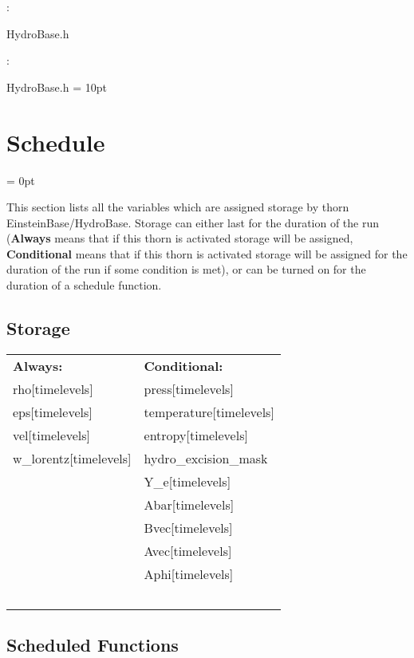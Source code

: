 \vspace{5mm}

: 



HydroBase.h
\vspace{2mm}

: 

HydroBase.h
\vspace{2mm}\parskip = 10pt 

\section{Schedule} 


\parskip = 0pt


\noindent This section lists all the variables which are assigned storage by thorn EinsteinBase/HydroBase.  Storage can either last for the duration of the run ({\bf Always} means that if this thorn is activated storage will be assigned, {\bf Conditional} means that if this thorn is activated storage will be assigned for the duration of the run if some condition is met), or can be turned on for the duration of a schedule function.


\subsection*{Storage}

\hspace{5mm}

 \begin{tabular*}{160mm}{ll} 

{\bf Always:}& {\bf Conditional:} \\ 
 rho[timelevels] &  press[timelevels]\\ 
 eps[timelevels] &  temperature[timelevels]\\ 
 vel[timelevels] &  entropy[timelevels]\\ 
 w\_lorentz[timelevels] &  hydro\_excision\_mask\\ 
~ &  Y\_e[timelevels]\\ 
~ &  Abar[timelevels]\\ 
~ &  Bvec[timelevels]\\ 
~ &  Avec[timelevels]\\ 
~ &  Aphi[timelevels]\\ 
~ & ~\\ 
\end{tabular*} 


\subsection*{Scheduled Functions}
\vspace{5mm}

